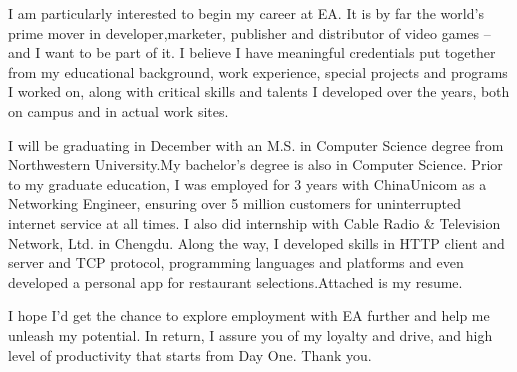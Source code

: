 \documentclass[10pt,stdletter]{newlfm}
\begin{document}
\begin{newlfm}

I am particularly interested to begin my career at EA.  It is by far the world's prime mover in developer,marketer, publisher and distributor of video games -- and I want to be part of it.  I believe I have meaningful credentials 
put together from my educational background, work experience, special projects and programs I worked on, along with critical skills and talents I developed over the years, both on campus and in actual work sites.

I will be graduating in December with an M.S. in Computer Science degree from Northwestern University.My bachelor's degree is also in Computer Science.  Prior to my graduate education, I was employed for 3 years with ChinaUnicom as a Networking Engineer, ensuring over 5 million customers for uninterrupted internet service at all times.  I also did internship with Cable Radio & Television Network, Ltd. in Chengdu.  Along the way, I developed skills in HTTP 
client and server and TCP protocol, programming languages and platforms and even developed a personal app for 
restaurant selections.Attached is my resume. 

I hope I'd get the chance to explore employment with EA further and help me unleash my potential.  In return, I assure you of my loyalty and drive, and high level of productivity that starts from Day One. Thank you.

\end{newlfm}
\end{document}
